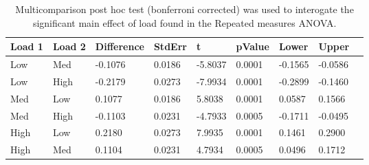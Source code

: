 \begin{table}
\centering
\begin{tabular}[0.2em]{@{}lllllllll@{}}\toprule
Load 1 & Load 2 & Difference & StdErr & t & pValue & Lower & Upper\\\toprule[0.2em]
Low & Med & -0.1076 & 0.0186 & -5.8037 & 0.0001 & -0.1565 & -0.0586 \\\midrule
Low & High & -0.2179 & 0.0273 & -7.9934 & 0.0001 & -0.2899 & -0.1460 \\\midrule
Med & Low & 0.1077 & 0.0186 & 5.8038 & 0.0001 & 0.0587 & 0.1566 \\\midrule
Med & High & -0.1103 & 0.0231 & -4.7933 & 0.0005 & -0.1711 & -0.0495 \\\midrule
High & Low & 0.2180 & 0.0273 & 7.9935 & 0.0001 & 0.1461 & 0.2900 \\\midrule
High & Med & 0.1104 & 0.0231 & 4.7934 & 0.0005 & 0.0496 & 0.1712 \\\bottomrule[0.2em]
\end{tabular}
\caption{Multicomparison post hoc test (bonferroni corrected) was used to interogate the significant main effect of load found in the Repeated measures ANOVA.\label{tabel:tbl_RMABA1_PH_load}}
\end{table}
